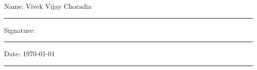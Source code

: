 \documentclass[11pt,oneside]{book}
\begin{document}
\noindent Name: Vivek Vijay Choradia\\[1mm]
\rule[1em]{25em}{0.5pt}

\noindent Signature:\\[1mm]
\rule[1em]{25em}{0.5pt}

\noindent Date: \today\\[1mm] 
\rule[1em]{25em}{0.5pt}








\tableofcontents
\listoffigures
\listoftables
\lstlistoflistings


\mainmatter








% 

% 

\printbibliography[heading=bibintoc, title={Bibliography}]
% 
% 

\begin{appendices}












\end{appendices}
\end{document}
